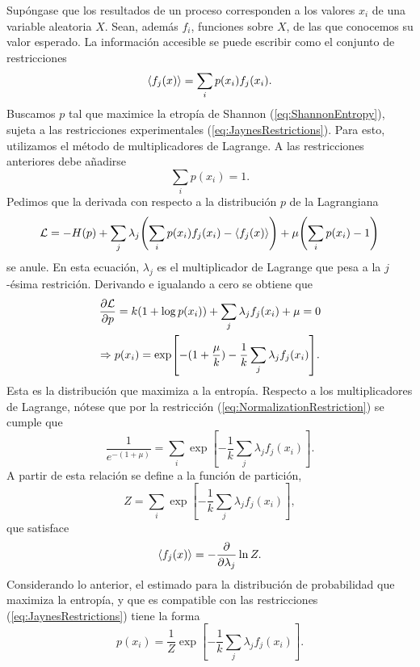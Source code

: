 Supóngase que los resultados de un proceso  corresponden a los valores $x_{i}$ de una variable aleatoria $X$. Sean, además $f_{i}$, funciones sobre $X$, de las que conocemos su valor esperado. La información accesible se puede escribir como el conjunto de restricciones
\begin{equation}\label{eq:JaynesRestrictions}
    \expval{f_{j}(x)}=\sum_{i}p(x_{i})f_{j}(x_{i}).
\end{equation}
Buscamos $p$ tal que maximice la etropía de Shannon (\ref{eq:ShannonEntropy}), sujeta a las restricciones experimentales (\ref{eq:JaynesRestrictions}). Para esto, utilizamos el método de multiplicadores de Lagrange. A las restricciones anteriores debe añadirse 
\begin{equation}\label{eq:NormalizationRestriction}
    \sum_{i}p(x_{i})=1.
\end{equation}
Pedimos que la derivada con respecto a la distribución $p$ de la Lagrangiana
\begin{equation*}
    \mathcal{L}=-H(p)+\sum_{j}\lambda_{j}\qty(\sum_{i}p(x_{i})f_{j}(x_{i})-\expval{f_{j}(x)})+\mu\qty(\sum_{i}p(x_{i})-1)
\end{equation*}
se anule. En esta ecuación, $\lambda_{j}$ es el multiplicador de Lagrange que pesa a la $j$-ésima restrición. Derivando e igualando a cero se obtiene que
\begin{gather*}
    \frac{\partial \mathcal{L}}{\partial p}=k(1+\log{p(x_{i})})+\sum_{j}\lambda_{j}f_{j}(x_{i})+\mu=0\\
    \Rightarrow p(x_{i})=\exp[-(1+\frac{\mu}{k})-\frac{1}{k}\sum_{j}\lambda_{j}f_{j}(x_{i})].
\end{gather*}
Esta es la distribución que maximiza a la entropía. Respecto a los multiplicadores de Lagrange, nótese que por la restricción (\ref{eq:NormalizationRestriction}) se cumple que
\begin{equation*}
    \frac{1}{e^{-(1+\mu)}}=\sum_{i}\exp[-\frac{1}{k}\sum_{j}\lambda_{j}f_{j}(x_{i})].
\end{equation*}
A partir de esta relación se define a la función de partición,
\begin{equation*}
    Z=\sum_{i}\exp[-\frac{1}{k}\sum_{j}\lambda_{j}f_{j}(x_{i})],
\end{equation*}
que satisface
\begin{equation*}
    \expval{f_{j}(x)}=-\frac{\partial}{\partial \lambda_{j}}\ln{Z}.
\end{equation*}
Considerando lo anterior, el estimado para la distribución de probabilidad que maximiza la entropía, y que es compatible con las restricciones (\ref{eq:JaynesRestrictions}) tiene la forma 
\begin{equation}\label{eq:MaxEntDist}
    p(x_{i})=\frac{1}{Z}\exp[-\frac{1}{k}\sum_{j}\lambda_{j}f_{j}(x_{i})].
\end{equation}

